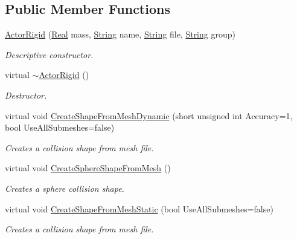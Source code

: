 \subsection*{Public Member Functions}
\begin{DoxyCompactItemize}
\item 
\hyperlink{classphys_1_1ActorRigid_abc5fd9a4ef92dddc4c640b6642994da1}{ActorRigid} (\hyperlink{namespacephys_af7eb897198d265b8e868f45240230d5f}{Real} mass, \hyperlink{namespacephys_aa03900411993de7fbfec4789bc1d392e}{String} name, \hyperlink{namespacephys_aa03900411993de7fbfec4789bc1d392e}{String} file, \hyperlink{namespacephys_aa03900411993de7fbfec4789bc1d392e}{String} group)
\begin{DoxyCompactList}\small\item\em Descriptive constructor. \item\end{DoxyCompactList}\item 
virtual \hyperlink{classphys_1_1ActorRigid_ab317b5a2578157e54655a1aea8f4d058}{$\sim$ActorRigid} ()
\begin{DoxyCompactList}\small\item\em Destructor. \item\end{DoxyCompactList}\item 
virtual void \hyperlink{classphys_1_1ActorRigid_a78f2f2dfc8b35f13e9a7680189bbdd48}{CreateShapeFromMeshDynamic} (short unsigned int Accuracy=1, bool UseAllSubmeshes=false)
\begin{DoxyCompactList}\small\item\em Creates a collision shape from mesh file. \item\end{DoxyCompactList}\item 
virtual void \hyperlink{classphys_1_1ActorRigid_ae401c116a07ee4ed3fc677e83308fba5}{CreateSphereShapeFromMesh} ()
\begin{DoxyCompactList}\small\item\em Creates a sphere collision shape. \item\end{DoxyCompactList}\item 
virtual void \hyperlink{classphys_1_1ActorRigid_a5adfa6199955f9c0de4e0af54aeb96f6}{CreateShapeFromMeshStatic} (bool UseAllSubmeshes=false)
\begin{DoxyCompactList}\small\item\em Creates a collision shape from mesh file. \item\end{DoxyCompactList}\item 

\end{DoxyCompactItemize}
